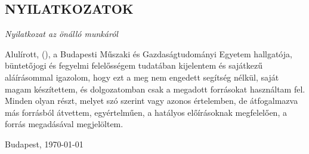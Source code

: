 \selecthungarian
{}
\setcounter{page}{6}
\cleardoublepage %
\begin{center}
\section*{NYILATKOZATOK}
\end{center}



\begin{center}
\emph{Nyilatkozat az önálló munkáról}
\end{center}
Alulírott,  \emph{\authorFamilyName{} \authorGivenName} (\neptun), a Budapesti Műszaki és Gazdaságtudományi Egyetem hallgatója, büntetőjogi és fegyelmi felelősségem tudatában kijelentem és sajátkezű aláírásommal igazolom, hogy ezt a \MakeLowercase{\gpkmunkatipustHU} meg nem engedett segítség nélkül, saját magam készítettem, és dolgozatomban csak a megadott forrásokat használtam fel. Minden olyan részt, melyet szó szerint vagy azonos értelemben, de átfogalmazva más forrásból átvettem, egyértelműen, a hatályos előírásoknak megfelelően, a forrás megadásával megjelöltem.

\begin{flushleft}
Budapest, \today
\end{flushleft}

\begin{flushright}
 \makebox[7cm]{\rule{6cm}{.4pt}}\\
\end{flushright}


\vfill
\clearpage

\selectthesislanguage

\setcounter{romanPage}{\value{page}}
